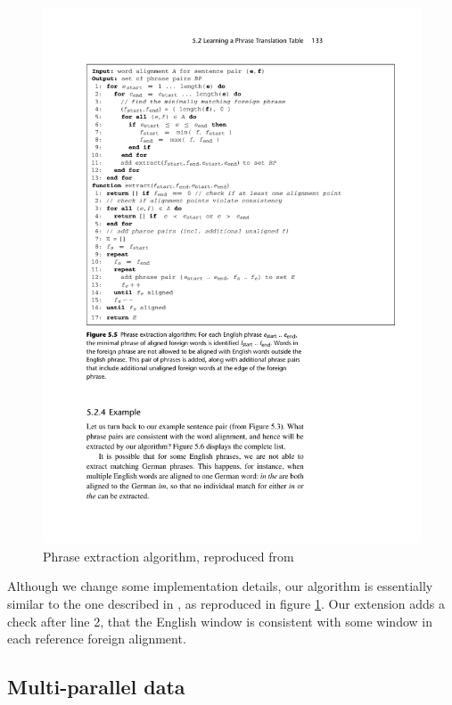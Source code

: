 \documentclass[11pt]{article}
\begin{document}
\begin{figure}[t]
\includegraphics[width=\textwidth]{koehnExtractionAlgorithm}
\caption{Phrase extraction algorithm, reproduced from \protect\cite{Koehn:2010}}
\label{f:algorithm}
\end{figure}

Although we change some implementation details, our algorithm is essentially similar to the one described in \cite[page 133]{Koehn:2010}, as reproduced in figure \ref{f:algorithm}. Our extension adds a check after line 2, that the English window is consistent with some window in each reference foreign alignment.



\subsection{Multi-parallel data}
\end{document}
